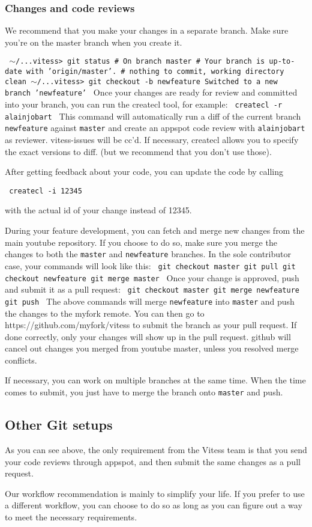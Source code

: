 \subsubsection{Changes and code reviews}\hypertarget{changes-and-code-reviews}{}\label{changes-and-code-reviews}

We recommend that you make your changes in a separate branch.
Make sure you're on the master branch when you create it.

{\tt 
\ensuremath{\sim}/...vitess\textgreater{} git status
\# On branch master
\# Your branch is up-to-date with 'origin/master'.
\#
nothing to commit, working directory clean
\ensuremath{\sim}/...vitess\textgreater{} git checkout -b newfeature
Switched to a new branch 'newfeature'
}
Once your changes are ready for review and committed into your branch,
you can run the createcl tool, for example:
{\tt 
createcl -r alainjobart
}
This command will automatically run a diff of the current branch {\tt newfeature}
against {\tt master} and create an appspot code review with {\tt alainjobart} as
reviewer. vitess-issues will be cc'd. If necessary, createcl allows you to
specify the exact versions to diff. (but we recommend that you don't use those).

After getting feedback about your code, you can update the code by calling

{\tt 
createcl -i 12345
}

with the actual id of your change instead of 12345.

During your feature development, you can fetch and merge new changes from the main youtube repository.
If you choose to do so, make sure you merge the changes to both the {\tt master} and {\tt newfeature} branches.
In the sole contributor case, your commands will look like this:
{\tt 
git checkout master
git pull
git checkout newfeature
git merge master
}
Once your change is approved, push and submit it as a pull request:
{\tt 
git checkout master
git merge newfeature
git push
}
The above commands will merge {\tt newfeature} into {\tt master} and push the changes to the myfork remote.
You can then go to https://github.com/myfork/vitess to submit the branch as your pull request.
If done correctly, only your changes will show up in the pull request.
github will cancel out changes you merged from youtube master, unless you resolved merge conflicts.

If necessary, you can work on multiple branches at the same time.
When the time comes to submit, you just have to merge the branch onto {\tt master} and push.

\subsection{Other Git setups}\hypertarget{other-git-setups}{}\label{other-git-setups}

As you can see above, the only requirement from the Vitess team is that you send
your code reviews through appspot, and then submit the same changes as a pull
request.

Our workflow recommendation is mainly to simplify your life. If you prefer to
use a different workflow, you can choose to do so as long as you can figure out
a way to meet the necessary requirements.

